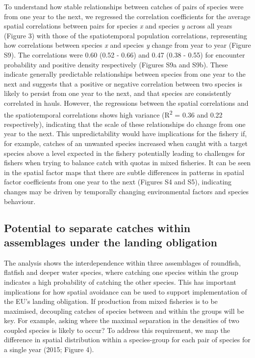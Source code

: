 \documentclass[fleqn,10pt]{wlscirep}
\begin{document}
\begin{linenumbers}
To understand how stable relationships between catches of pairs of species were
from one year to the next, we regressed the correlation coefficients for the
average spatial correlations between pairs for species \textit{x} and species
\textit{y} across all years (Figure 3) with those of the spatiotemporal
population correlations, representing how correlations between species
\textit{x} and species \textit{y} change from year to year (Figure S9). The
correlations were 0.60 (0.52 - 0.66) and 0.47 (0.38 - 0.55) for encounter
probability and positive density respectively (Figures S9a and S9b). These
indicate generally predictable relationships between species from one year to
the next and suggests that a positive or negative correlation between two
species is likely to persist from one year to the next, and that species are
consistently correlated in hauls.  However, the regressions between the spatial
correlations and the spatiotemporal correlations shows high variance
(R\textsuperscript{2} = 0.36 and 0.22 respectively), indicating that the scale
of these relationships do change from one year to the next. This
unpredictability would have implications for the fishery if, for example,
catches of an unwanted species increased when caught with a target species
above a level expected in the fishery  potentially leading to challenges for
fishers when trying to balance catch with quotas in mixed fisheries. It can  be
seen in the spatial factor maps that there are subtle differences in  patterns
in spatial factor coefficients from one year to the next (Figures S4 and S5),
indicating changes may be driven by temporally changing environmental factors
and species behaviour.\\

\subsection*{ Potential to separate catches within assemblages under the
	landing obligation\\} 
The analysis shows the interdependence within three assemblages of roundfish,
flatfish and deeper water species, where catching one species within the group
indicates a high probability of catching the other species. This has important
implications for how spatial avoidance can be used to support implementation of
the EU's landing obligation. If production from mixed fisheries is to be
maximised, decoupling catches of species between and within the groups will be
key. For example, asking where the maximal separation in the densities of two
coupled species is likely to occur? To address this requirement, we map the
difference in spatial distribution within a species-group for each pair of
species for a single year (2015; Figure 4). \\


\end{linenumbers}
\end{document}
